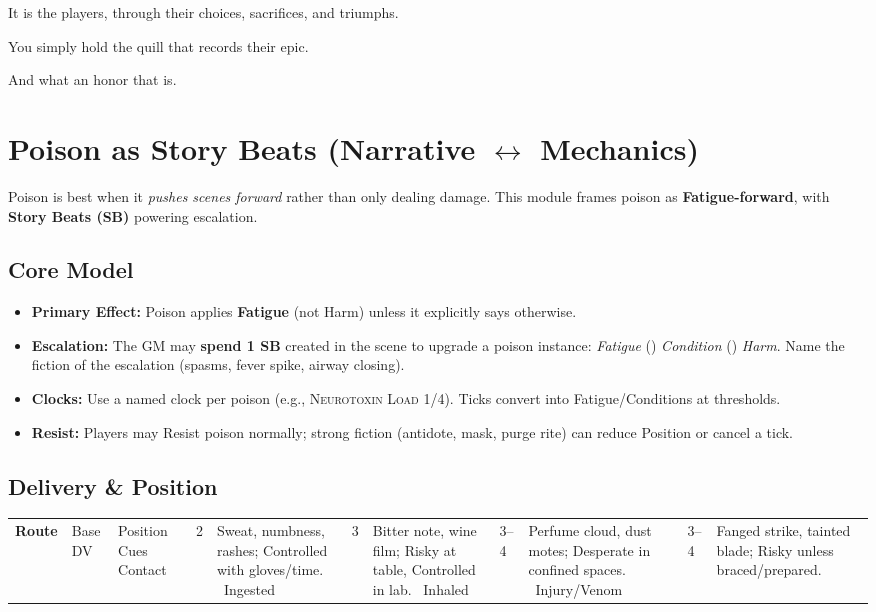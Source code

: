 It is the players, through their choices, sacrifices, and triumphs.

You simply hold the quill that records their epic.

And what an honor that is.


\section{Poison as Story Beats (Narrative \texorpdfstring{$\leftrightarrow$}{↔} Mechanics)}\label{sec:poison-sb}

Poison is best when it \emph{pushes scenes forward} rather than only dealing damage. This module frames poison as \textbf{Fatigue-forward}, with \textbf{Story Beats (SB)} powering escalation.

\subsection*{Core Model}
\begin{itemize}
\item \textbf{Primary Effect:} Poison applies \textbf{Fatigue} (not Harm) unless it explicitly says otherwise.
\item \textbf{Escalation:} The GM may \textbf{spend 1 SB} created in the scene to upgrade a poison instance: \emph{Fatigue} (\to) \emph{Condition} (\to) \emph{Harm}. Name the fiction of the escalation (spasms, fever spike, airway closing).
\item \textbf{Clocks:} Use a named clock per poison (e.g., \textsc{Neurotoxin Load} 1/4). Ticks convert into Fatigue/Conditions at thresholds.
\item \textbf{Resist:} Players may Resist poison normally; strong fiction (antidote, mask, purge rite) can reduce Position or cancel a tick.
\end{itemize}

\subsection*{Delivery \& Position}
\begin{tabularx}{\linewidth}{>{\bfseries}l l X}
\toprule
Route & Base DV & Position Cues \
\midrule
Contact & 2 & Sweat, numbness, rashes; Controlled with gloves/time. \
Ingested & 3 & Bitter note, wine film; Risky at table, Controlled in lab. \
Inhaled & 3--4 & Perfume cloud, dust motes; Desperate in confined spaces. \
Injury/Venom & 3--4 & Fanged strike, tainted blade; Risky unless braced/prepared. \
\bottomrule
\end{tabularx}

